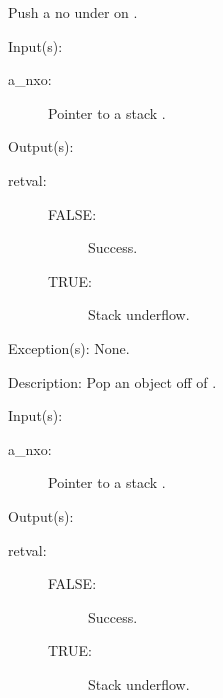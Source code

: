 \begin{capi}
\begin{capilist}
		Push a no  under  on
		.
	\end{capilist}
\label{nxo_stack_pop}
	\begin{capilist}
	\item[Input(s): ]
		\begin{description}\item[]
		\item[a\_nxo: ]
			Pointer to a stack .
		\end{description}
	\item[Output(s): ]
		\begin{description}\item[]
		\item[retval: ]
			\begin{description}\item[]
			\item[FALSE: ]
				Success.
			\item[TRUE: ]
				Stack underflow.
			\end{description}
		\end{description}
	\item[Exception(s): ] None.
	\item[Description: ]
		Pop an object off of .
	\end{capilist}
\label{nxo_stack_bpop}
	\begin{capilist}
	\item[Input(s): ]
		\begin{description}\item[]
		\item[a\_nxo: ]
			Pointer to a stack \classname{nxo}.
		\end{description}
	\item[Output(s): ]
		\begin{description}\item[]
		\item[retval: ]
			\begin{description}\item[]
			\item[FALSE: ]
				Success.
			\item[TRUE: ]
				Stack underflow.
			\end{description}
		\end{description}

\end{capilist}
\end{capi}

